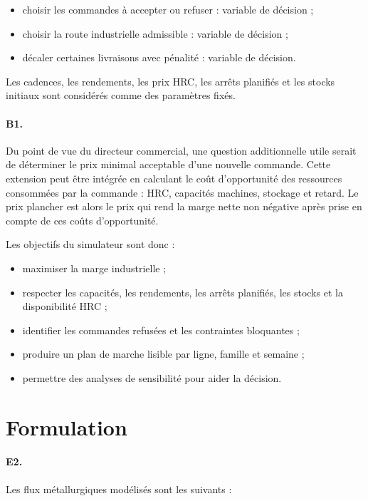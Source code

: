 \documentclass[12pt,a4paper]{article}
\newcommand{\question}[1]{\paragraph{\textcolor{blue!50!black}{#1.}}}
\newcommand{\sectiontarget}[1]{}
\begin{document}
\begin{itemize}
    \item choisir les commandes à accepter ou refuser : variable de décision ;
    \item choisir la route industrielle admissible : variable de décision ;
    \item décaler certaines livraisons avec pénalité : variable de décision.
\end{itemize}

Les cadences, les rendements, les prix HRC, les arrêts planifiés et les stocks initiaux sont considérés comme des paramètres fixés.

\question{B1}
Du point de vue du directeur commercial, une question additionnelle utile serait de déterminer le prix minimal acceptable d'une nouvelle commande. Cette extension peut être intégrée en calculant le coût d'opportunité des ressources consommées par la commande : HRC, capacités machines, stockage et retard. Le prix plancher est alors le prix qui rend la marge nette non négative après prise en compte de ces coûts d'opportunité.

Les objectifs du simulateur sont donc :

\begin{itemize}
    \item maximiser la marge industrielle ;
    \item respecter les capacités, les rendements, les arrêts planifiés, les stocks et la disponibilité HRC ;
    \item identifier les commandes refusées et les contraintes bloquantes ;
    \item produire un plan de marche lisible par ligne, famille et semaine ;
    \item permettre des analyses de sensibilité pour aider la décision.
\end{itemize}

\clearpage
\section{Formulation}
\sectiontarget{4 a 6 pages}

\question{E2}
Les flux métallurgiques modélisés sont les suivants :
\end{document}
